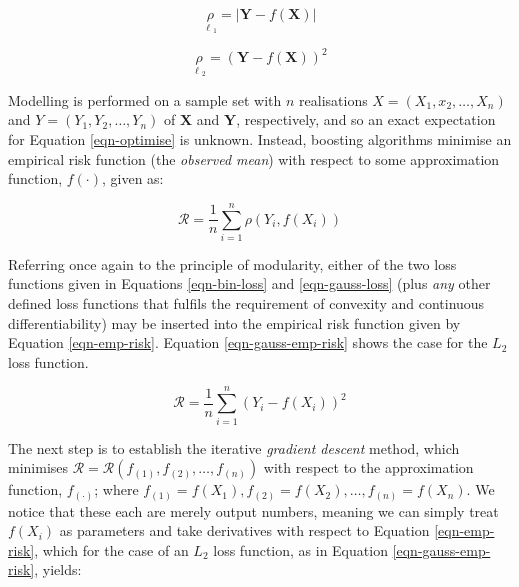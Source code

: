 \documentclass{article}
\begin{document}
  \begin{equation}
    \underset{\ell{_1}}{\rho} = |\mathbf{Y} - f(\mathbf{X})|
    \label{eqn-bin-loss}
  \end{equation}

  \begin{equation}
     \underset{\ell{_2}}{\rho} = (\mathbf{Y} - f(\mathbf{X}))^2
    \label{eqn-gauss-loss}
  \end{equation}

\vspace{3mm}

Modelling is performed on a sample set with $n$ realisations $X = (X_1, x_2, … , X_n)$ and $Y = (Y_1, Y_2, … , Y_n)$ of $\mathbf{X}$ and $\mathbf{Y}$, respectively, and so an exact expectation for Equation \eqref{eqn-optimise} is unknown. Instead, boosting algorithms minimise an empirical risk function (the \emph{observed mean}) with respect to some approximation function, $f(\cdot)$, given as:

\begin{equation}
  \label{eqn-emp-risk}
  \mathcal{R} = \frac{1}{n} \sum_{i=1}^{n} \rho(Y_i, f(X_i))
\end{equation}

\vspace{3mm}

Referring once again to the principle of modularity, either of the two loss functions given in Equations \eqref{eqn-bin-loss} and \eqref{eqn-gauss-loss} (plus \emph{any} other defined loss functions that fulfils the requirement of convexity and continuous differentiability) may be inserted into the empirical risk function given by Equation \eqref{eqn-emp-risk}. Equation \eqref{eqn-gauss-emp-risk} shows the case for the $L_2$ loss function.

\begin{equation}
  \mathcal{R} = \frac{1}{n} \sum_{i=1}^{n} (Y_i - f(X_i))^2
  \label{eqn-gauss-emp-risk}
\end{equation}

\vspace{3mm}

The next step is to establish the iterative \emph{gradient descent} method, which minimises $\mathcal{R} = \mathcal{R}(f_{(1)}, f_{(2)}, … , f_{(n)})$ with respect to the approximation function, $f_{(\cdot)}$; where $f_{(1)} = f(X_1), f_{(2)} = f(X_2), … , f_{(n)} = f(X_n)$. We notice that these each are merely output numbers, meaning we can simply treat $f(X_i)$ as parameters and take derivatives with respect to Equation \eqref{eqn-emp-risk}, which for the case of an $L_2$ loss function, as in Equation \eqref{eqn-gauss-emp-risk}, yields:
\end{document}
